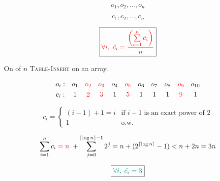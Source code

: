 
\begin{frame}{}
  \centerline{}

  \vspace{0.50cm}
\end{frame}

\begin{frame}{}
  \[
    o_1, o_2, \ldots, o_n
  \]

  \[
    c_1, c_2, \ldots, c_n
  \]

  \pause
  \[
    \boxed{\textcolor{red}{\forall i,\; \hat{c_i} = \frac{\left(\sum\limits_{i = 1}^{n} c_i\right)}{n}}}
  \]
\end{frame}

\begin{frame}{}
  \centerline{}

  \pause
  \vspace{0.30cm}
  \centerline{On  of $n$ \textsc{Table-Insert} on an  array.}

  \pause
  \vspace{0.30cm}
  \[
    \begin{array}{ccccccccccc}
      o_i:  & o_1 & \textcolor{red}{o_2} & \textcolor{red}{o_3} & o_4 & \textcolor{red}{o_5} & o_6 & o_7 & o_8 & \textcolor{red}{o_9} & o_{10} \\[3pt]
      c_i:  & 1 & \textcolor{red}{2} & \textcolor{red}{3} & 1 & \textcolor{red}{5} & 1 & 1 & 1 & \textcolor{red}{9} & 1  \\
    \end{array}
  \]

  \pause
  \vspace{0.30cm}
  \begin{displaymath}
    c_i = \left\{ \begin{array}{ll}
      (i-1)+1 = i & \textrm{if $i - 1$ is an exact power of 2}\\
      1 & \textrm{o.w.}
    \end{array} \right.
  \end{displaymath}

  \pause
  \vspace{0.30cm}
  \[
    \sum_{i=1}^{n} c_i \;\textcolor{red}{=}\;\textcolor{purple}{n}\; + \sum_{j=0}^{\lceil \log n \rceil - 1} 2^{j} 
      = n + (2^{\lceil \log n \rceil} - 1) < n + 2n = 3n
  \]

  \pause
  \[
    \boxed{\textcolor{teal}{\forall i,\; \hat{c_i} = 3}}
  \]
\end{frame}
